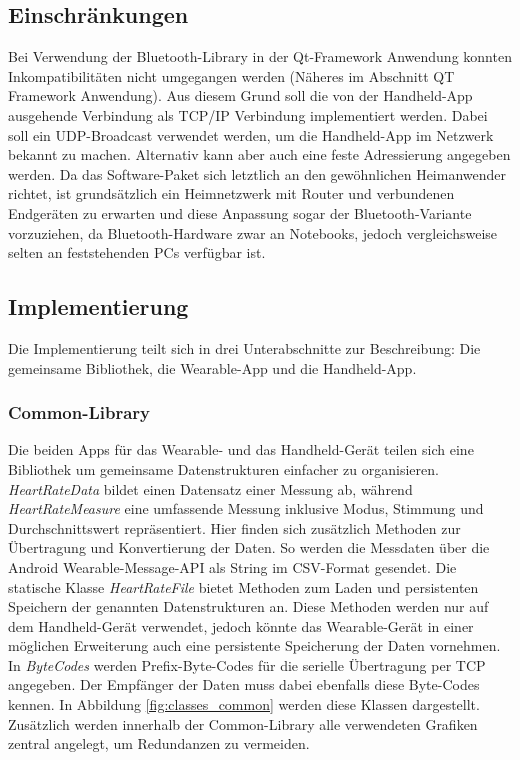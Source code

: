 \subsection{Einschränkungen} \label{sec:einschraenkungen}
Bei Verwendung der Bluetooth-Library in der Qt-Framework Anwendung konnten Inkompatibilitäten nicht umgegangen werden (Näheres im Abschnitt QT Framework Anwendung). Aus diesem Grund soll die von der Handheld-App ausgehende Verbindung als TCP/IP Verbindung implementiert werden. Dabei soll ein UDP-Broadcast verwendet werden, um die Handheld-App im Netzwerk bekannt zu machen. Alternativ kann aber auch eine feste Adressierung angegeben werden. Da das Software-Paket sich letztlich an den gewöhnlichen Heimanwender richtet, ist grundsätzlich ein Heimnetzwerk mit Router und verbundenen Endgeräten zu erwarten und diese Anpassung sogar der Bluetooth-Variante vorzuziehen, da Bluetooth-Hardware zwar an Notebooks, jedoch vergleichsweise selten an feststehenden PCs verfügbar ist.

\subsection{Implementierung}
Die Implementierung teilt sich in drei Unterabschnitte zur Beschreibung: Die gemeinsame Bibliothek, die Wearable-App und die Handheld-App.
\subsubsection{Common-Library}
Die beiden Apps für das Wearable- und das Handheld-Gerät teilen sich eine Bibliothek um gemeinsame Datenstrukturen einfacher zu organisieren. \textit{HeartRateData} bildet einen Datensatz einer Messung ab, während \textit{HeartRateMeasure} eine umfassende Messung inklusive Modus, Stimmung und Durchschnittswert repräsentiert. Hier finden sich zusätzlich Methoden zur Übertragung und Konvertierung der Daten. So werden die Messdaten über die Android Wearable-Message-API als String im CSV-Format gesendet. Die statische Klasse \textit{HeartRateFile} bietet Methoden zum Laden und persistenten Speichern der genannten Datenstrukturen an. Diese Methoden werden nur auf dem Handheld-Gerät verwendet, jedoch könnte das Wearable-Gerät in einer möglichen Erweiterung auch eine persistente Speicherung der Daten vornehmen. In \textit{ByteCodes} werden Prefix-Byte-Codes für die serielle Übertragung per TCP angegeben. Der Empfänger der Daten muss dabei ebenfalls diese Byte-Codes kennen. In Abbildung \ref{fig:classes_common} werden diese Klassen dargestellt. Zusätzlich werden innerhalb der Common-Library alle verwendeten Grafiken zentral angelegt, um Redundanzen zu vermeiden.

